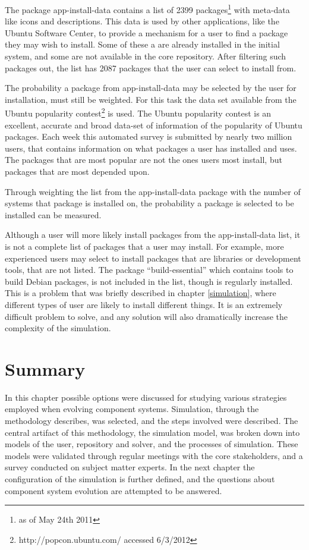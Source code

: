 The package app-install-data contains a list of 2399 packages\footnote{as of May 24th 2011} with meta-data like icons and descriptions.
This data is used by other applications, like the Ubuntu Software Center, to provide a mechanism for a user to find a package they may wish to install.
Some of these a are already installed in the initial system, and some are not available in the core repository.
After filtering such packages out, the list has 2087 packages that the user can select to install from. 

The probability a package from app-install-data may be selected by the user for installation, must still be weighted.
For this task the data set available from the Ubuntu popularity contest\footnote{http://popcon.ubuntu.com/ accessed 6/3/2012} is used.
The Ubuntu popularity contest is an excellent, accurate and broad data-set of information of the popularity of Ubuntu packages.
Each week this automated survey is submitted by nearly two million users, that contains information on what packages a user has installed and uses.
The packages that are most popular are not the ones users most install, but packages that are most depended upon.

Through weighting the list from the app-install-data package with the number of systems that package is installed on,
the probability a package is selected to be installed can be measured.

Although a user will more likely install packages from the app-install-data list, it is not a complete list of packages that a user may install. 
For example, more experienced users may select to install packages that are libraries or development tools, that are not listed.
The package ``build-essential'' which contains tools to build Debian packages, is not included in the list, though is regularly installed.
This is a problem that was briefly described in chapter \ref{simulation}, where different types of user are likely to install different things.
It is an extremely difficult problem to solve, and any solution will also dramatically increase the complexity of the simulation.



\section{Summary}
{}In this chapter possible options were discussed for studying various strategies employed when evolving component systems.
{}Simulation, through the methodology \citep{Law2005} describes, was selected, and the steps involved were described.
{}The central artifact of this methodology, the simulation model, was broken down into models of the user, repository and solver, and the processes of simulation.
{}These models were validated through regular meetings with the core stakeholders, and a survey conducted on subject matter experts.
{}In the next chapter the configuration of the simulation is further defined, and the questions about component system evolution are attempted to be answered.

